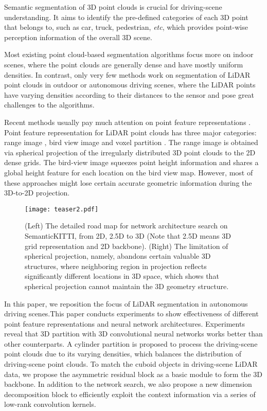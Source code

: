 \documentclass{article}
\def\etc{\emph{etc}}
\begin{document}
	 {Semantic segmentation of 3D point clouds is crucial for {driving-}scene understanding. It aims to identify the pre-defined categories of each 3D point that belongs to, such as {car, truck, pedestrian,} \etc, which provides point-wise perception information of the overall 3D scene.}
	


    Most existing point cloud-based segmentation algorithms {focus more on} indoor scenes, {where the point clouds are generally dense and have mostly uniform {densities}.} In contrast, only
    very few {methods} {work} on {segmentation of LiDAR point clouds in outdoor or autonomous driving scenes, where the LiDAR points have varying densities according to their distances to the sensor and pose {great} challenges to the algorithms.} 


    Recent methods usually pay much attention on point feature representations \citep{wu2018squeezeseg, zhang2020polarnet, graham20183d}. Point feature representation for LiDAR point clouds has three major {categories}: range image \citep{milioto2019rangenet++,wu2018squeezeseg}, bird view
   image \citep{zhang2020polarnet} and voxel partition \citep{graham20183d, cciccek20163d}. The range image {is obtained via} spherical projection of the irregularly distributed 3D point clouds to the 2D dense grids. The bird-view image squeezes point height information and shares a global height feature for each location on the bird view map. However, most of these approaches {might lose certain accurate geometric information during the {3D-to-2D} projection.}


    
    \begin{figure*}
    \centering
    \texttt{[image: teaser2.pdf]}
    \caption{{(Left)} The detailed road map for {network architecture search on SemanticKITTI}, from 2D, 2.5D to 3D (Note that 2.5D means 3D grid representation and 2D backbone). {(Right)} The limitation of spherical projection, namely, {abandons certain valuable 3D structures}, where neighboring region in projection reflects significantly different locations in 3D space, which shows that spherical projection cannot maintain the 3D geometry structure.}
    \label{fig:3d_conv}
    \end{figure*}
    
    
     In this paper, we reposition the focus of LiDAR segmentation in autonomous driving scenes.This paper conducts experiments to show effectiveness of different point feature representations and neural network architectures. Experiments reveal that 3D partition with 3D convolutional neural networks works better than other counterparts. A cylinder partition is proposed to process the driving-scene point clouds due to its varying densities, which balances the distribution of driving-scene point clouds. To match the cuboid objects in driving-scene LiDAR data, we propose the asymmetric residual block as a basic module to form the 3D backbone.
     {In addition to the network search, we also propose a new dimension decomposition block to efficiently exploit the context information via a series of low-rank convolution kernels.}
    
\end{document}
